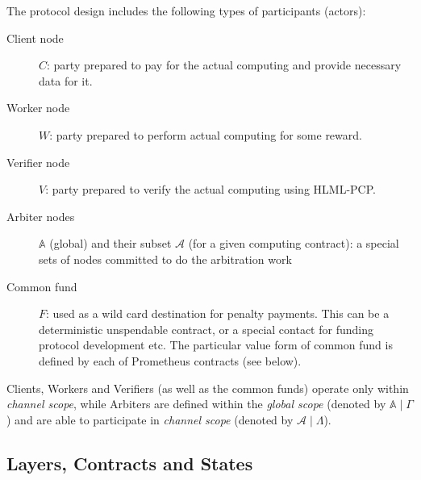 \documentclass[a4paper]{article}
\begin{document}
The protocol design includes the following types of participants (actors):
\begin{description}
    \item[Client node] $C$: party prepared to pay for the actual computing and provide necessary data for it.
    \item[Worker node] $W$: party prepared to perform actual computing for some reward.
    \item[Verifier node] $V$: party prepared to verify the actual computing using HLML-PCP.
    \item[Arbiter nodes] $\mathbb{A}$ (global) and their subset $\mathcal{A}$ (for a given computing contract): a special sets of nodes committed to do the arbitration work
    \item[Common fund] $F$: used as a wild card destination for penalty payments. This can be a deterministic unspendable contract, or a special contact for funding protocol development etc. The particular value form of common fund is defined by each of Prometheus contracts (see below).
\end{description}

Clients, Workers and Verifiers (as well as the common funds) operate only within \textit{channel scope}, while Arbiters are defined within the \textit{global scope} (denoted by $\mathbb{A} \mid \Gamma$) and are able to participate in \textit{channel scope} (denoted by $\mathcal{A} \mid \Lambda$).

\subsection{Layers, Contracts and States}
\label{layers_contracts}
\end{document}
